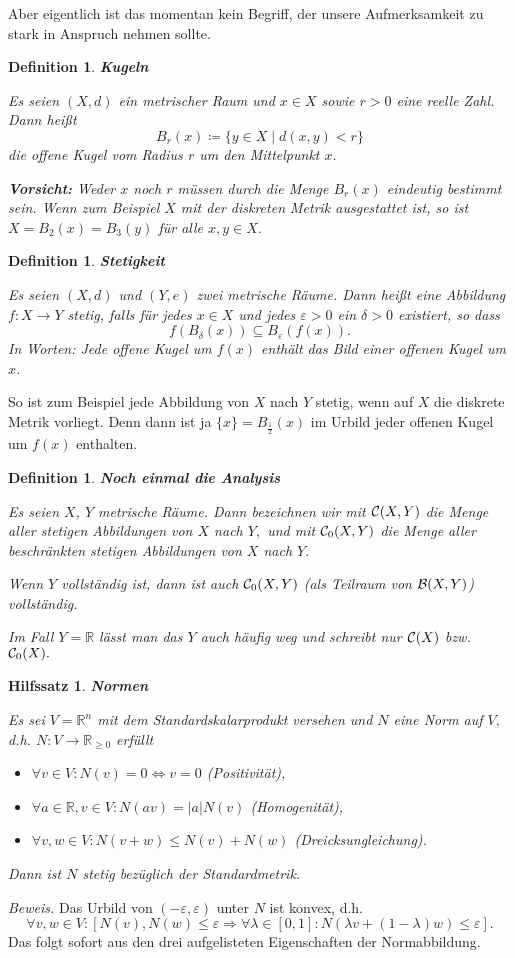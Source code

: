 \documentclass[12pt]{scrbook}   %
\newtheorem{hilfsX}[alles]{Hilfssatz}
\newenvironment{hilfs}[1]{\begin{hilfsX}{\bf #1}\par}{\end{hilfsX}}
\newtheorem{definiX}[alles]{Definition}
\newenvironment{defini}[1]{\begin{definiX}{\bf #1}\par\rm}{\end{definiX}}
\newcommand{\da}{\coloneqq}
\begin{document}
Aber eigentlich ist das momentan kein Begriff, der unsere Aufmerksamkeit zu 
stark in Anspruch nehmen sollte. 

\begin{defini}{Kugeln}
Es seien $(X,d)$ ein metrischer Raum und $x\in X$ sowie $r>0$ eine reelle 
Zahl. Dann heißt
$$B_r(x) \da \{y\in X \mid d(x,y)<r\}$$
die {\it offene Kugel} vom Radius $r$ um den Mittelpunkt $x.$ 

{\bf Vorsicht:} Weder $x$ noch $r$ müssen durch die Menge $B_r(x)$ eindeutig 
bestimmt sein.
Wenn zum Beispiel $X$ mit der diskreten Metrik ausgestattet ist, so ist 
$X=B_2(x) = B_3(y)$ für alle $x,y\in X.$
\end{defini}

\begin{defini}{Stetigkeit}
\label{stetig1}
Es seien $(X,d)$ und $(Y,e)$ zwei metrische Räume. Dann heißt eine
Abbildung $f:X\longrightarrow Y$ {\rm stetig}, falls für jedes 
$x\in X$ und jedes $\varepsilon>0$ ein $\delta>0$ existiert, so dass
$$f(B_\delta(x)) \subseteq B_\varepsilon(f(x)).$$
In Worten: Jede offene Kugel um $f(x)$ enthält das Bild einer offenen Kugel 
um $x$.
\end{defini}

So ist zum Beispiel jede Abbildung von $X$ nach $Y$ stetig, wenn auf $X$ die 
diskrete Metrik vorliegt. Denn dann ist ja $\{x\} = B_{\frac12}(x)$ im Urbild
jeder offenen Kugel um $f(x)$ enthalten.

\begin{defini}{Noch einmal die Analysis}
Es seien $X$, $Y$ metrische Räume. Dann bezeichnen wir mit 
${\cal C}(X,Y)$ die Menge aller stetigen Abbildungen von $X$ nach $Y,$ und 
mit ${\cal C}_0(X,Y)$ die Menge aller beschränkten stetigen Abbildungen
von $X$ nach $Y.$ 

Wenn $Y$ vollständig ist, dann ist auch ${\cal C}_0(X,Y)$ (als Teilraum von
${\cal B}(X,Y)$) vollständig. 

Im Fall $Y=\mathbb R$ lässt man das $Y$ auch häufig weg und schreibt nur 
${\cal C}(X)$ bzw.\ ${\cal C}_0(X).$
\end{defini}

\begin{hilfs}{Normen}\label{Normen}
Es sei $V=\mathbb R^n$ mit dem Standardskalarprodukt versehen und $N$ eine
Norm auf $V,$ d.h. $N:V\longrightarrow \mathbb R_{\geq 0}$ erfüllt 
\begin{itemize}
\item $\forall v\in V:N(v) = 0 \iff v=0$ (Positivität),
\item $\forall a\in \mathbb R,v\in V: N(av) = |a|N(v)$ (Homogenität),
\item $\forall v,w\in V: N(v+w) \leq N(v) + N(w)$ (Dreicksungleichung).
\end{itemize}
Dann ist $N$ stetig bezüglich der Standardmetrik.
\end{hilfs}
{\it Beweis.} Das Urbild von $(-\varepsilon , \varepsilon)$ unter $N$ ist 
konvex, d.h. 
$$\forall v,w\in V: [N(v),N(w)\leq \varepsilon\Rightarrow 
\forall \lambda\in [0,1]: N(\lambda v + (1-\lambda) w) \leq \varepsilon].$$
Das folgt sofort aus den drei aufgelisteten Eigenschaften der Normabbildung. 
\end{document}
